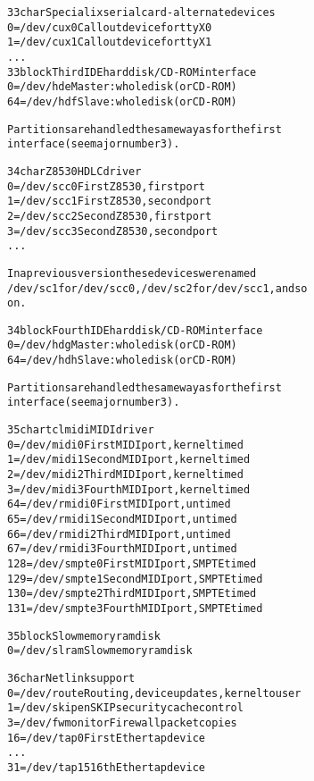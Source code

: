 \documentclass[a4paper,8pt,english]{sphinxmanual}
\begin{document}
\begin{alltt}
  33 char       Specialix serial card - alternate devices
                  0 = /dev/cux0         Callout device for ttyX0
                  1 = /dev/cux1         Callout device for ttyX1
                    ...
  33 block      Third IDE hard disk/CD-ROM interface
                  0 = /dev/hde          Master: whole disk (or CD-ROM)
                 64 = /dev/hdf          Slave: whole disk (or CD-ROM)

                Partitions are handled the same way as for the first
                interface (see major number 3).

  34 char       Z8530 HDLC driver
                  0 = /dev/scc0         First Z8530, first port
                  1 = /dev/scc1         First Z8530, second port
                  2 = /dev/scc2         Second Z8530, first port
                  3 = /dev/scc3         Second Z8530, second port
                    ...

                In a previous version these devices were named
                /dev/sc1 for /dev/scc0, /dev/sc2 for /dev/scc1, and so
                on.

  34 block      Fourth IDE hard disk/CD-ROM interface
                  0 = /dev/hdg          Master: whole disk (or CD-ROM)
                 64 = /dev/hdh          Slave: whole disk (or CD-ROM)

                Partitions are handled the same way as for the first
                interface (see major number 3).

  35 char       tclmidi MIDI driver
                  0 = /dev/midi0        First MIDI port, kernel timed
                  1 = /dev/midi1        Second MIDI port, kernel timed
                  2 = /dev/midi2        Third MIDI port, kernel timed
                  3 = /dev/midi3        Fourth MIDI port, kernel timed
                 64 = /dev/rmidi0       First MIDI port, untimed
                 65 = /dev/rmidi1       Second MIDI port, untimed
                 66 = /dev/rmidi2       Third MIDI port, untimed
                 67 = /dev/rmidi3       Fourth MIDI port, untimed
                128 = /dev/smpte0       First MIDI port, SMPTE timed
                129 = /dev/smpte1       Second MIDI port, SMPTE timed
                130 = /dev/smpte2       Third MIDI port, SMPTE timed
                131 = /dev/smpte3       Fourth MIDI port, SMPTE timed

  35 block      Slow memory ramdisk
                  0 = /dev/slram        Slow memory ramdisk

  36 char       Netlink support
                  0 = /dev/route        Routing, device updates, kernel to user
                  1 = /dev/skip         enSKIP security cache control
                  3 = /dev/fwmonitor    Firewall packet copies
                 16 = /dev/tap0         First Ethertap device
                    ...
                 31 = /dev/tap15        16th Ethertap device


\end{alltt}
\end{document}
